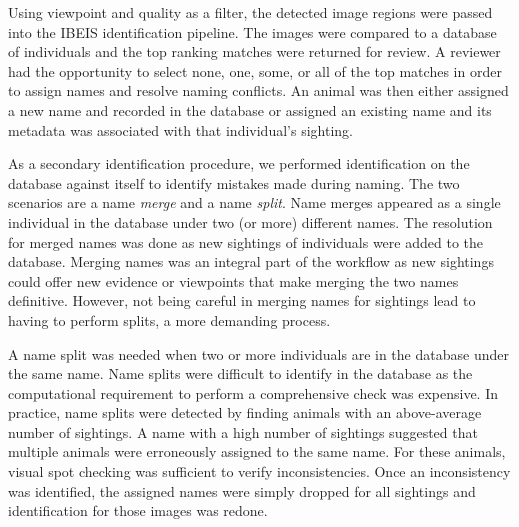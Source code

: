 Using viewpoint and quality as a filter, the detected image regions were passed into the IBEIS identification pipeline.  The images were compared to a database of individuals and the top ranking matches were returned for review.  A reviewer had the opportunity to select none, one, some, or all of the top matches in order to assign names and resolve naming conflicts.  An animal was then either assigned a new name and recorded in the database or assigned an existing name and its metadata was associated with that individual's sighting.

As a secondary identification procedure, we performed identification on the database against itself to identify mistakes made during naming.  The two scenarios are a name \textit{merge} and a name \textit{split}.  Name merges appeared as a single individual in the database under two (or more) different names.  The resolution for merged names was done as new sightings of individuals were added to the database.  Merging names was an integral part of the workflow as new sightings could offer new evidence or viewpoints that make merging the two names definitive.  However, not being careful in merging names for sightings lead to having to perform splits, a more demanding process.

A name split was needed when two or more individuals are in the database under the same name.  Name splits were difficult to identify in the database as the computational requirement to perform a comprehensive check was expensive.  In practice, name splits were detected by finding animals with an above-average number of sightings.  A name with a high number of sightings suggested that multiple animals were erroneously assigned to the same name.  For these animals, visual spot checking was sufficient to verify inconsistencies.  Once an inconsistency was identified, the assigned names were simply dropped for all sightings and identification for those images was redone.

